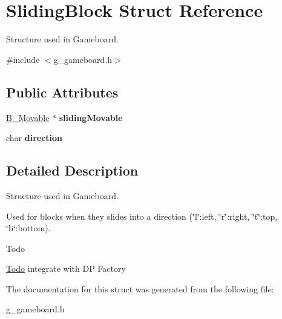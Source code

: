 \hypertarget{struct_sliding_block}{}\section{Sliding\+Block Struct Reference}
\label{struct_sliding_block}


Structure used in Gameboard.  




{\ttfamily \#include $<$g\+\_\+gameboard.\+h$>$}

\subsection*{Public Attributes}
\begin{DoxyCompactItemize}
\item 
\hypertarget{struct_sliding_block_a85d039a937b35441f54fe2a49b9e8905}{}\hyperlink{class_b___movable}{B\+\_\+\+Movable} $\ast$ {\bfseries sliding\+Movable}\label{struct_sliding_block_a85d039a937b35441f54fe2a49b9e8905}

\item 
\hypertarget{struct_sliding_block_abef74df81b435be022550c58c8b0608d}{}char {\bfseries direction}\label{struct_sliding_block_abef74df81b435be022550c58c8b0608d}

\end{DoxyCompactItemize}


\subsection{Detailed Description}
Structure used in Gameboard. 

Used for blocks when they slides into a direction (\char`\"{}l\char`\"{}\+:left, \char`\"{}r\char`\"{}\+:right, \char`\"{}t\char`\"{}\+:top, \char`\"{}b\char`\"{}\+:bottom). \begin{DoxyRefDesc}{Todo}
\item[\hyperlink{todo__todo000007}{Todo}]integrate with D\+P Factory \end{DoxyRefDesc}


The documentation for this struct was generated from the following file\+:\begin{DoxyCompactItemize}
\item 
g\+\_\+gameboard.\+h\end{DoxyCompactItemize}
